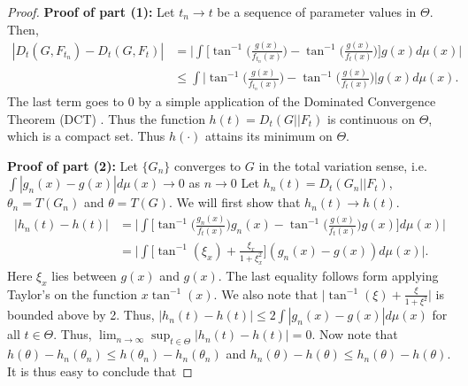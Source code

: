 \documentclass{article}
\begin{document}
\begin{proof}
\textbf{Proof of part (1):}
     Let $t_n \to t$ be a sequence of parameter values in $\Theta$. Then, 
    \begin{align*}
        |D_t(G,F_{t_n})-D_t(G,F_{t})| & =\bigg|\int \bigg[\tan^{-1}\bigg(\frac{g(x)}{f_{t_n}(x)}\bigg)-\tan^{-1}\bigg(\frac{g(x)}{f_{t}(x)}\bigg)\bigg]g(x)d\mu(x)\bigg|\\
        & \leq \int \bigg|\tan^{-1}\bigg(\frac{g(x)}{f_{t_n}(x)}\bigg)-\tan^{-1}\bigg(\frac{g(x)}{f_{t}(x)}\bigg)\bigg|g(x)d\mu(x).
    \end{align*}
    The last term goes to $0$ by a simple application of the Dominated Convergence Theorem (DCT) \citep{billingsley2008probability}. Thus the function $h(t)=D_t(G||F_t)$ is continuous on $\Theta$, which is a compact set. Thus $h(\cdot)$ attains its minimum on $\Theta$.\par
    \textbf{Proof of part (2):}
     Let $\{G_n\}$ converges to $G$ in the total variation sense, i.e. $\int|g_n(x)-g(x)|d\mu(x) \to 0$ as $n \to 0$ Let $h_n(t)=D_t(G_n||F_t)$, $\theta_n=T(G_n)$ and $\theta=T(G)$. We will first show that $h_n(t) \to h(t)$.
     \begingroup
     \allowdisplaybreaks
    \begin{align*}
        |h_n(t)-h(t)|   & =\bigg|\int \bigg[\tan^{-1}\bigg(\frac{g_n(x)}{f_{t}(x)}\bigg)g_n(x)  -\tan^{-1}\bigg(\frac{g(x)}{f_{t}(x)}\bigg)g(x)\bigg]d\mu(x)\bigg|\\
        & = \bigg|\int \bigg[\tan^{-1}(\xi_x)+\frac{\xi_x}{1+\xi_x^2}\bigg](g_n(x)-g(x))d\mu(x)\bigg|.
    \end{align*}
    \endgroup
    Here $\xi_x$ lies between $g(x)$ and $g(x)$. The last equality follows form applying Taylor's on the function $x\tan^{-1}(x)$. We also note that $\bigg|\tan^{-1}(\xi)+\frac{\xi}{1+\xi^2}\bigg|$ is bounded above by 2. Thus,
    $|h_n(t)-h(t)|\leq 2\int|g_n(x)-g(x)|d\mu(x)$ for all $t \in \Theta$. Thus, $\lim_{n \to \infty}\sup_{t \in \Theta}|h_n(t)-h(t)|=0.$ Now note that $ h(\theta)-h_n(\theta_n)\leq h(\theta_n)-h_n(\theta_n)$ and $h_n(\theta)-h(\theta)\leq h_n(\theta)-h(\theta).$ It is thus easy to conclude that

\end{proof}
\end{document}
